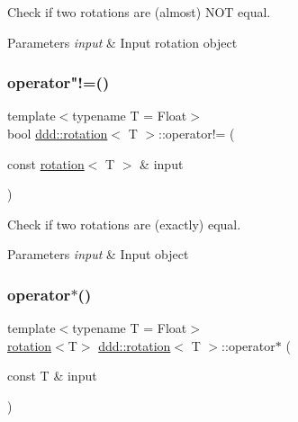 Check if two rotations are (almost) N\+OT equal. 


\begin{DoxyParams}{Parameters}
{\em input} & Input rotation object \\
\hline
\end{DoxyParams}
\mbox{\label{classddd_1_1rotation_abfeae27a919ada418d2cdcce96e5e08d}} 
\subsubsection{\texorpdfstring{operator"!=()}{operator!=()}}
{\footnotesize\ttfamily template$<$typename T  = Float$>$ \\
bool \hyperlink{classddd_1_1rotation}{ddd\+::rotation}$<$ T $>$\+::operator!= (\begin{DoxyParamCaption}\item[{const \hyperlink{classddd_1_1rotation}{rotation}$<$ T $>$ \&}]{input }\end{DoxyParamCaption})\hspace{0.3cm}{\ttfamily [inline]}}



Check if two rotations are (exactly) equal. 


\begin{DoxyParams}{Parameters}
{\em input} & Input object \\
\hline
\end{DoxyParams}
\mbox{\label{classddd_1_1rotation_aada9691ca7067feefd0a0206f8c8d035}} 
\subsubsection{\texorpdfstring{operator$\ast$()}{operator*()}\hspace{0.1cm}{\footnotesize\ttfamily [1/4]}}
{\footnotesize\ttfamily template$<$typename T  = Float$>$ \\
\hyperlink{classddd_1_1rotation}{rotation}$<$T$>$ \hyperlink{classddd_1_1rotation}{ddd\+::rotation}$<$ T $>$\+::operator$\ast$ (\begin{DoxyParamCaption}\item[{const T \&}]{input }\end{DoxyParamCaption})\hspace{0.3cm}{\ttfamily [inline]}}



